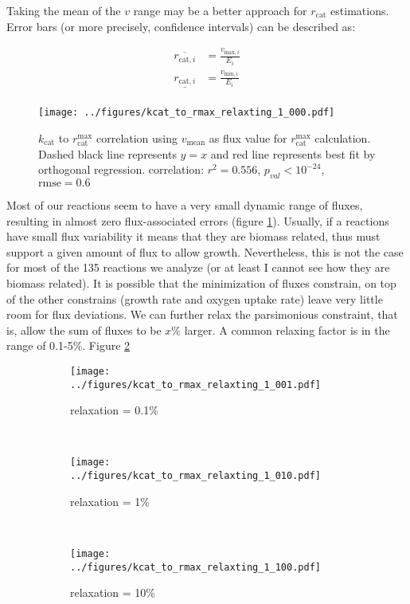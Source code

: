 \documentclass{article}
\newcommand{\kcat}{$k_\mathrm{cat}$ }
\newcommand{\rcat}{$r_\mathrm{cat}$ }
\newcommand{\rmax}{$r_\mathrm{cat}^\mathrm{max}$ }
\begin{document}
Taking the mean of the $v$ range may be a better approach for \rcat estimations. Error bars (or more precisely, confidence intervals) can be described as:

\begin{align}
\overline{r_{\mathrm{cat}, i}} &= \frac{v_{\mathrm{max}, i}}{E_i} \\
\underline{r_{\mathrm{cat}, i}} &= \frac{v_{\mathrm{min}, i}}{E_i} \\
\end{align}

\begin{figure}
	\center
	\texttt{[image: ../figures/kcat\_to\_rmax\_relaxting\_1\_000.pdf]}
	\caption{\kcat to \rmax correlation using $v_\mathrm{mean}$ as flux value for \rmax calculation. Dashed black line 	represents $y=x$ and red line represents best fit by orthogonal regression. correlation: $r^2 = 0.556$, $p_{val} < 10^{-24}$, $\mathrm{rmse} = 0.6$}
	\label{fig:pFVA}
\end{figure}

Most of our reactions seem to have a very small dynamic range of fluxes, resulting in almost zero flux-associated errors (figure \ref{fig:pFVA}). Usually, if a reactions have small flux variability it means that they are biomass related, thus must support a given amount of flux to allow growth. Nevertheless, this is not the case for most of the 135 reactions we analyze (or at least I cannot see how they are biomass related). It is possible that the minimization of fluxes constrain, on top of the other constrains (growth rate and oxygen uptake rate) leave very little room for flux deviations. We can further relax the parsimonious constraint, that is, allow the sum of fluxes to be $x\%$ larger. A common relaxing factor is in the range of 0.1-5\%. Figure \ref{fig:relax} 

\begin{figure}
        \center
        \begin{subfigure}[b]{0.3\textwidth}
                \texttt{[image: ../figures/kcat\_to\_rmax\_relaxting\_1\_001.pdf]}
                \caption{relaxation = 0.1\%}
        \end{subfigure}%
        ~ %
        \begin{subfigure}[b]{0.3\textwidth}
                \texttt{[image: ../figures/kcat\_to\_rmax\_relaxting\_1\_010.pdf]}
                \caption{relaxation = 1\%}
        \end{subfigure}
        ~ %
        \begin{subfigure}[b]{0.3\textwidth}
                \texttt{[image: ../figures/kcat\_to\_rmax\_relaxting\_1\_100.pdf]}
                \caption{relaxation = 10\%}
        \end{subfigure}
	\caption{}
	\label{fig:relax}	
\end{figure}
\end{document}
